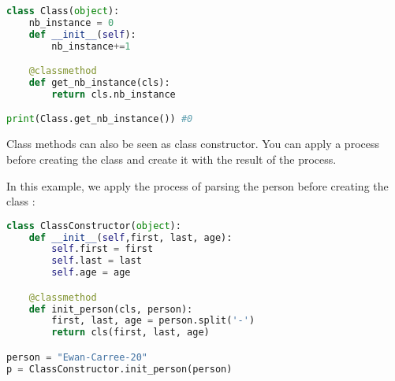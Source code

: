 \documentclass[a4paper, 12pt, titlepage]{scrartcl} %
\begin{document}
\begin{lstlisting}[language=Python]
class Class(object):
	nb_instance = 0
	def __init__(self):
		nb_instance+=1

	@classmethod
	def get_nb_instance(cls):
		return cls.nb_instance

print(Class.get_nb_instance()) #0
\end{lstlisting} \vspace{5mm}

Class methods can also be seen as class constructor. You can apply a process before creating the class and create it with the result of the process.

\vspace{5mm}

In this example, we apply the process of parsing the person before creating the class :

\begin{lstlisting}[language=Python]
class ClassConstructor(object):
	def __init__(self,first, last, age):
		self.first = first
		self.last = last
		self.age = age

	@classmethod
	def init_person(cls, person):
		first, last, age = person.split('-')
		return cls(first, last, age)

person = "Ewan-Carree-20"
p = ClassConstructor.init_person(person)
\end{lstlisting} \vspace{5mm}
\end{document}

